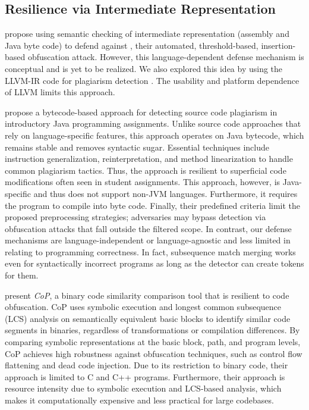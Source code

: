 \subsection{Resilience via Intermediate Representation}
\citet{DevoreMcDonald2020} propose using semantic checking of intermediate representation (assembly and Java byte code) to defend against \mossad, their automated, threshold-based, insertion-based obfuscation attack. However, this language-dependent defense mechanism is conceptual and is yet to be realized.
We also explored this idea by using the LLVM-IR code for plagiarism detection \cite{Heneka2023}. The usability and platform dependence of LLVM limits this approach.

\citet{Karnalim2016} propose a bytecode-based approach for detecting source code plagiarism in introductory Java programming assignments. Unlike source code approaches that rely on language-specific features, this approach operates on Java bytecode, which remains stable and removes syntactic sugar. Essential techniques include instruction generalization, reinterpretation, and method linearization to handle common plagiarism tactics. Thus, the approach is resilient to superficial code modifications often seen in student assignments.
This approach, however, is Java-specific and thus does not support non-JVM languages. Furthermore, it requires the program to compile into byte code. Finally, their predefined criteria limit the proposed preprocessing strategies; adversaries may bypass detection via obfuscation attacks that fall outside the filtered scope.
%
In contrast, our defense mechanisms are language-independent or language-agnostic and less limited in relating to programming correctness. In fact, subsequence match merging works even for syntactically incorrect programs as long as the detector can create tokens for them.

\citet{Luo2017} present \textit{CoP}, a binary code similarity comparison tool that is resilient to code obfuscation. CoP uses symbolic execution and longest common subsequence (LCS) analysis on semantically equivalent basic blocks to identify similar code segments in binaries, regardless of transformations or compilation differences. By comparing symbolic representations at the basic block, path, and program levels, CoP achieves high robustness against obfuscation techniques, such as control flow flattening and dead code injection. Due to its restriction to binary code, their approach is limited to C and C++ programs.
Furthermore, their approach is resource intensity due to symbolic execution and LCS-based analysis, which makes it computationally expensive and less practical for large codebases.

